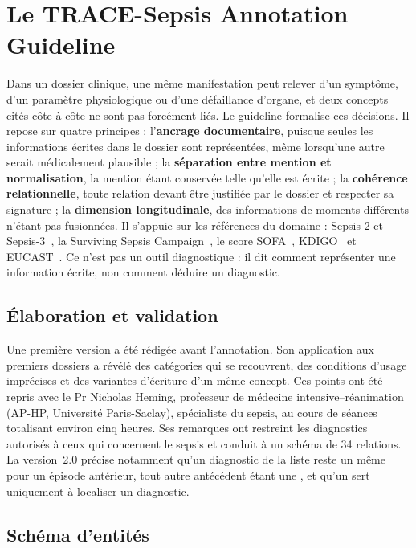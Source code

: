 \section{Le TRACE-Sepsis Annotation Guideline}\label{sec:c3-3-3}

Dans un dossier clinique, une même manifestation peut relever d’un symptôme, d’un paramètre physiologique ou d’une défaillance d’organe, et deux concepts cités côte à côte ne sont pas forcément liés. Le guideline formalise ces décisions. Il repose sur quatre principes : l’\textbf{ancrage documentaire}, puisque seules les informations écrites dans le dossier sont représentées, même lorsqu’une autre serait médicalement plausible ; la \textbf{séparation entre mention et normalisation}, la mention étant conservée telle qu’elle est écrite ; la \textbf{cohérence relationnelle}, toute relation devant être justifiée par le dossier et respecter sa signature ; la \textbf{dimension longitudinale}, des informations de moments différents n’étant pas fusionnées. Il s’appuie sur les références du domaine : Sepsis-2 et Sepsis-3~\cite{levy2003sccm,singer2016third}, la Surviving Sepsis Campaign~\cite{evans2021ssc}, le score SOFA~\cite{vincent1996sofa}, KDIGO~\cite{kdigo2012aki} et EUCAST~\cite{eucast}. Ce n’est pas un outil diagnostique : il dit comment représenter une information écrite, non comment déduire un diagnostic.

\subsection{Élaboration et validation}\label{sec:c3-3-3-4}

Une première version a été rédigée avant l’annotation. Son application aux premiers dossiers a révélé des catégories qui se recouvrent, des conditions d’usage imprécises et des variantes d’écriture d’un même concept. Ces points ont été repris avec le Pr Nicholas Heming, professeur de médecine intensive--réanimation (AP-HP, Université Paris-Saclay), spécialiste du sepsis, au cours de séances totalisant environ cinq heures. Ses remarques ont restreint les diagnostics autorisés à ceux qui concernent le sepsis et conduit à un schéma de 34 relations. La version~2.0 précise notamment qu’un diagnostic de la liste reste un  même pour un épisode antérieur, tout autre antécédent étant une , et qu’un  sert uniquement à localiser un diagnostic.

\subsection{Schéma d’entités}\label{sec:c3-3-4}


